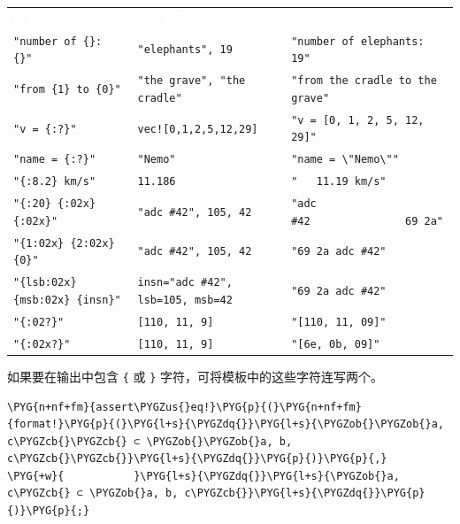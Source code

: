 
\myTableBegin
\begin{tabularx}{\textwidth}{@{}>{\hsize=0.947\hsize\raggedright\arraybackslash}X>{\hsize=0.917\hsize\raggedright\arraybackslash}X>{\hsize=1.136\hsize\raggedright\arraybackslash}X@{}}
\rowcolor{tabhead}\textcolor{white}{模板字符串} & \textcolor{white}{参数列表} & \textcolor{white}{结果} \\
\texttt{"number of \{\}: \{\}"} & \texttt{"elephants", 19} & \texttt{"number of elephants: 19"} \\
\texttt{"from \{1\} to \{0\}"} & \texttt{"the grave", "the cradle"} & \texttt{"from the cradle to the grave"} \\
\texttt{"v = \{:?\}"} & \texttt{vec![0,1,2,5,12,29]} & \texttt{"v = [0, 1, 2, 5, 12, 29]"} \\
\texttt{"name = \{:?\}"} & \texttt{"Nemo"} & \texttt{"name = \textbackslash{}"Nemo\textbackslash{}""} \\
\texttt{"\{:8.2\} km/s"} & \texttt{11.186} & \texttt{"   11.19 km/s"} \\
\texttt{"\{:20\} \{:02x\} \{:02x\}"} & \texttt{"adc \#42", 105, 42} & \texttt{"adc \#42               69 2a"} \\
\texttt{"\{1:02x\} \{2:02x\} \{0\}"} & \texttt{"adc \#42", 105, 42} & \texttt{"69 2a adc \#42"} \\
\texttt{"\{lsb:02x\} \{msb:02x\} \{insn\}"} & \texttt{insn="adc \#42", lsb=105, msb=42} & \texttt{"69 2a adc \#42"} \\
\texttt{"\{:02?\}"} & \texttt{[110, 11, 9]} & \texttt{"[110, 11, 09]"} \\
\texttt{"\{:02x?\}"} & \texttt{[110, 11, 9]} & \texttt{"[6e, 0b, 09]"} \\
\end{tabularx}
\myTableEnd

如果要在输出中包含 \texttt{\{} 或 \texttt{\}} 字符，可将模板中的这些字符连写两个。

\begin{Verbatim}[commandchars=\\\{\},breaklines=true,breakanywhere=true,fontsize=\codefont,xleftmargin=17bp]
\PYG{n+nf+fm}{assert\PYGZus{}eq!}\PYG{p}{(}\PYG{n+nf+fm}{format!}\PYG{p}{(}\PYG{l+s}{\PYGZdq{}}\PYG{l+s}{\PYGZob{}\PYGZob{}a, c\PYGZcb{}\PYGZcb{} ⊂ \PYGZob{}\PYGZob{}a, b, c\PYGZcb{}\PYGZcb{}}\PYG{l+s}{\PYGZdq{}}\PYG{p}{)}\PYG{p}{,}
\PYG{+w}{           }\PYG{l+s}{\PYGZdq{}}\PYG{l+s}{\PYGZob{}a, c\PYGZcb{} ⊂ \PYGZob{}a, b, c\PYGZcb{}}\PYG{l+s}{\PYGZdq{}}\PYG{p}{)}\PYG{p}{;}
\end{Verbatim}

